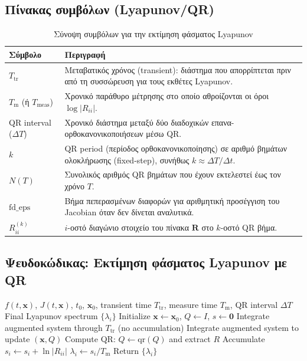 \documentclass[11pt,a4paper]{report}
\begin{document}
\subsection*{Πίνακας συμβόλων (Lyapunov/QR)}
\begin{table}[H]
\centering
\caption{Σύνοψη συμβόλων για την εκτίμηση φάσματος Lyapunov}
\label{tab:lyapunov-symbols}
\renewcommand{\arraystretch}{1.2}
\begin{tabular}{|l|p{}|}
\hline
\textbf{Σύμβολο} & \textbf{Περιγραφή} \\
\hline
$T_{\mathrm{tr}}$ & Μεταβατικός χρόνος (transient): διάστημα που απορρίπτεται πριν από τη συσσώρευση για τους εκθέτες Lyapunov. \\
\hline
$T_{\mathrm{m}}$ (ή $T_{\mathrm{meas}}$) & Χρονικό παράθυρο μέτρησης στο οποίο αθροίζονται οι όροι $\log|R_{ii}|$. \\
\hline
QR interval ($\Delta T$) & Χρονικό διάστημα μεταξύ δύο διαδοχικών επανα-ορθοκανονικοποιήσεων μέσω QR. \\
\hline
$k$ & QR period (περίοδος ορθοκανονικοποίησης) σε αριθμό βημάτων ολοκλήρωσης (fixed-step), συνήθως $k \approx \Delta T/\Delta t$. \\
\hline
$N(T)$ & Συνολικός αριθμός QR βημάτων που έχουν εκτελεστεί έως τον χρόνο $T$. \\
\hline
$\mathrm{fd\_eps}$ & Βήμα πεπερασμένων διαφορών για αριθμητική προσέγγιση του Jacobian όταν δεν δίνεται αναλυτικά. \\
\hline
$R^{(k)}_{ii}$ & $i$-οστό διαγώνιο στοιχείο του πίνακα $\mathbf{R}$ στο $k$-οστό QR βήμα. \\
\hline
\end{tabular}
\end{table}
\subsection*{Ψευδοκώδικας: Εκτίμηση φάσματος Lyapunov με QR}
\begin{algorithm}[H]
\caption{Lyapunov spectrum via variational equations and periodic QR}
\label{alg:lyapunov-qr}
\begin{tcolorbox}[appendixalgobox]
\begin{algorithmic}[1]
\Require $f(t,\mathbf{x})$, $J(t,\mathbf{x})$, $t_0$, $\mathbf{x}_0$, transient time $T_{\mathrm{tr}}$, measure time $T_{\mathrm{m}}$, QR interval $\Delta T$
\Ensure Final Lyapunov spectrum $\{\lambda_i\}$
\State Initialize $\mathbf{x}\leftarrow \mathbf{x}_0$, $Q\leftarrow I$, $s\leftarrow \mathbf{0}$
\State Integrate augmented system through $T_{\mathrm{tr}}$ (no accumulation)
  \State Integrate augmented system to update $(\mathbf{x},Q)$
  \State Compute QR: $Q \leftarrow \mathrm{qr}(Q)$ and extract $R$
  \State Accumulate $s_i \leftarrow s_i + \ln |R_{ii}|$
\EndFor
\State $\lambda_i \leftarrow s_i / T_{\mathrm{m}}$
\State Return $\{\lambda_i\}$
\end{algorithmic}
\end{tcolorbox}
\end{algorithm}
\end{document}
